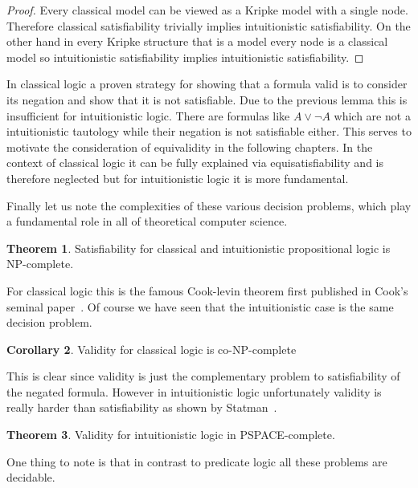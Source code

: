\documentclass[a4paper,11pt]{report}
\theoremstyle{definition}
\newtheorem{theorem}{Theorem}[section]
\theoremstyle{definition}
\newtheorem{corollary}[theorem]{Corollary}
\theoremstyle{definition}
\theoremstyle{definition}
\theoremstyle{definition}
\theoremstyle{definition}
\theoremstyle{definition}
\begin{document}
	\begin{proof}
		Every classical model can be viewed as a Kripke model with a single node. Therefore classical satisfiability trivially implies intuitionistic satisfiability.	On the other hand in every Kripke structure that is a model every node is a classical model so intuitionistic satisfiability implies intuitionistic satisfiability.
	\end{proof}

	In classical logic a proven strategy for showing that a formula valid is to consider its negation and show that it is not satisfiable. Due to the previous lemma this is insufficient for intuitionistic logic. There are formulas like $A\vee\neg A$ which are not a intuitionistic tautology while their negation is not satisfiable either. This serves to motivate the consideration of equivalidity in the following chapters. In the context of classical logic it can be fully explained via equisatisfiability and is therefore neglected but for intuitionistic logic it is more fundamental.
	
	Finally let us note the complexities of these various decision problems, which play a fundamental role in all of theoretical computer science.
	
	\begin{theorem}
		Satisfiability for classical and intuitionistic propositional logic is NP-complete.
	\end{theorem}

	For classical logic this is the famous Cook-levin theorem first published in Cook's seminal paper~\cite{cook1971complexity}. Of course we have seen that the intuitionistic case is the same decision problem.
	
	\begin{corollary}
		Validity for classical logic is co-NP-complete
	\end{corollary}

	This is clear since validity is just the complementary problem to satisfiability of the negated formula. However in intuitionistic logic unfortunately validity is really harder than satisfiability as shown by Statman~\cite{statman1979intuitionistic}.
	
	\begin{theorem}
		Validity for intuitionistic logic in PSPACE-complete.
	\end{theorem}

	One thing to note is that in contrast to predicate logic all these problems are decidable.
	
\end{document}
